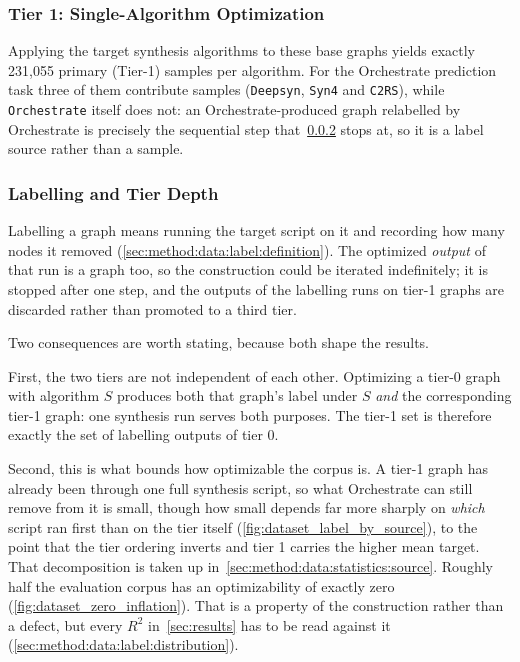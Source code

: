 \subsubsection{Tier 1: Single-Algorithm Optimization}
\label{sec:method:data:tier1}
Applying the target synthesis algorithms to these base graphs yields exactly 231,055
primary (Tier-1) samples per algorithm. For the Orchestrate prediction task three of
them contribute samples (\texttt{Deepsyn}, \texttt{Syn4} and \texttt{C2RS}), while
\texttt{Orchestrate} itself does not: an Orchestrate-produced graph relabelled by
Orchestrate is precisely the sequential step
that~\ref{sec:method:data:tiers:labelling} stops at, so it is a label source rather than a
sample.

\subsubsection{Labelling and Tier Depth}
\label{sec:method:data:tiers:labelling}
Labelling a graph means running the target script on it and recording how many nodes it
removed (\ref{sec:method:data:label:definition}). The optimized \emph{output} of that run
is a graph too, so the construction could be iterated indefinitely; it is stopped after
one step, and the outputs of the labelling runs on tier-1 graphs are discarded rather than
promoted to a third tier.

Two consequences are worth stating, because both shape the results.

First, the two tiers are not independent of each other. Optimizing a tier-0 graph with
algorithm $S$ produces both that graph's label under $S$ \emph{and} the corresponding
tier-1 graph: one synthesis run serves both purposes. The tier-1 set is therefore exactly
the set of labelling outputs of tier 0.

Second, this is what bounds how optimizable the corpus is. A tier-1 graph has already been
through one full synthesis script, so what Orchestrate can still remove from it is small,
though how small depends far more sharply on \emph{which} script ran first than on the tier
itself (\ref{fig:dataset_label_by_source}), to the point that the tier ordering inverts and
tier 1 carries the higher mean target. That decomposition is taken up
in~\ref{sec:method:data:statistics:source}. Roughly half the evaluation corpus has an
optimizability of exactly zero (\ref{fig:dataset_zero_inflation}). That is a property of
the construction rather than a defect, but every $R^2$ in~\ref{sec:results} has to be read
against it (\ref{sec:method:data:label:distribution}).

